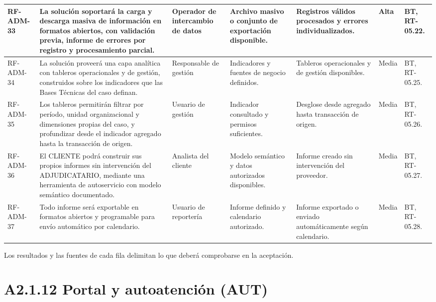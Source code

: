 \begin{longtable}{|L{0.080645\AnchoTablaAnexo}|L{0.262097\AnchoTablaAnexo}|L{0.100806\AnchoTablaAnexo}|L{0.145161\AnchoTablaAnexo}|L{0.173387\AnchoTablaAnexo}|L{0.060484\AnchoTablaAnexo}|L{0.177420\AnchoTablaAnexo}|}
RF-\allowbreak{}ADM-\allowbreak{}33 &
La solución soportará la carga y descarga masiva de información en formatos abiertos, con validación previa, informe de errores por registro y procesamiento parcial. &
Operador de intercambio de datos &
Archivo masivo o conjunto de exportación disponible. &
Registros válidos procesados y errores individualizados. &
Alta &
BT, RT-05.22. \\ \hline

RF-\allowbreak{}ADM-\allowbreak{}34 &
La solución proveerá una capa analítica con tableros operacionales y de gestión, construidos sobre los indicadores que las Bases Técnicas del caso definan. &
Responsable de gestión &
Indicadores y fuentes de negocio definidos. &
Tableros operacionales y de gestión disponibles. &
Media &
BT, RT-05.25. \\ \hline

RF-\allowbreak{}ADM-\allowbreak{}35 &
Los tableros permitirán filtrar por período, unidad organizacional y dimensiones propias del caso, y profundizar desde el indicador agregado hasta la transacción de origen. &
Usuario de gestión &
Indicador consultado y permisos suficientes. &
Desglose desde agregado hasta transacción de origen. &
Media &
BT, RT-05.26. \\ \hline

RF-\allowbreak{}ADM-\allowbreak{}36 &
El CLIENTE podrá construir sus propios informes sin intervención del ADJUDICATARIO, mediante una herramienta de autoservicio con modelo semántico documentado. &
Analista del cliente &
Modelo semántico y datos autorizados disponibles. &
Informe creado sin intervención del proveedor. &
Media &
BT, RT-05.27. \\ \hline

RF-\allowbreak{}ADM-\allowbreak{}37 &
Todo informe será exportable en formatos abiertos y programable para envío automático por calendario. &
Usuario de reportería &
Informe definido y calendario autorizado. &
Informe exportado o enviado automáticamente según calendario. &
Media &
BT, RT-05.28. \\ \hline

\end{longtable}

Los resultados y las fuentes de cada fila delimitan lo que deberá comprobarse en la aceptación.

\clearpage\section*{A2.1.12 Portal y autoatención (AUT)}


